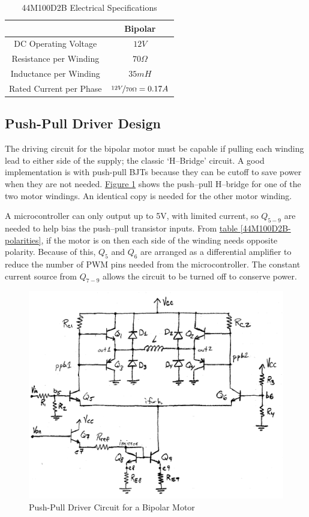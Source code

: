 \documentclass[10pt, twocolumn]{article}
\begin{document}
\begin{table}
\centering
\caption{44M100D2B Electrical Specifications}
\begin{tabular}{c | c }
\hline\hline
&Bipolar	\\
\hline\hline
DC Operating Voltage	&$12V$	\\
Resistance per Winding	&$70\Omega$	\\
Inductance per Winding	&$35mH$	\\
Rated Current per Phase	&$\nicefrac{12V}{70\Omega}=0.17A$	\\
\hline\hline
\end{tabular}
\end{table}

\subsection{Push-Pull Driver Design}

The driving circuit for the bipolar motor must be capable if pulling 
each winding lead to either side of the supply; the classic
`H--Bridge' circuit.
A good implementation is with push-pull BJTs because they can be
cutoff to save power when they are not needed.
\hyperref[motor-driver-circuit]{Figure \ref{motor-driver-circuit}}
shows the push--pull H--bridge for one of the two motor windings.
An identical copy is needed for the other motor winding.

A microcontroller can only output up to 5V, with limited current, so
$Q_{5-9}$ are needed to help bias the push--pull transistor inputs.
From \hyperref[44M100D2B-polarities]{table \ref{44M100D2B-polarities}},
if the motor is on then each side of the winding needs opposite
polarity. Because of this,
$Q_{5}$ and $Q_{6}$ are arranged as a differential amplifier
to reduce the number of PWM pins needed from the microcontroller.
The constant current source from $Q_{7-9}$ allows the circuit to be turned
off to conserve power.

\begin{figure}
	\centering
	\includegraphics[width=.65\textwidth]{Figures/motor-driver-circuit.pdf}
	\caption{Push-Pull Driver Circuit for a Bipolar Motor}
	\label{motor-driver-circuit}
\end{figure}
\end{document}
